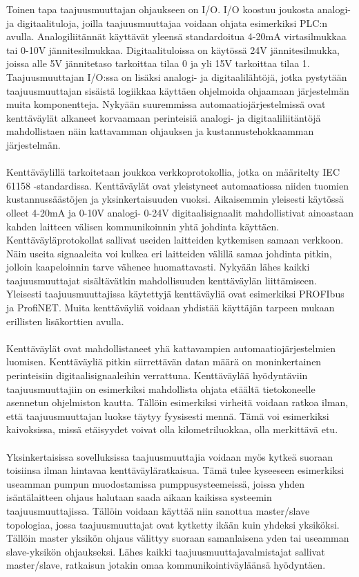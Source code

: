 \documentclass[finnish,12pt,a4paper,pdftex,elec,utf8]{aaltothesis}
\begin{document}
\noindent
Toinen tapa taajuusmuuttajan ohjaukseen on I/O. I/O koostuu joukosta analogi- ja digitaalituloja, joilla taajuusmuuttajaa voidaan ohjata esimerkiksi PLC:n avulla. Analogiliitännät käyttävät yleensä standardoitua 4-20mA virtasilmukkaa tai 0-10V jännitesilmukkaa. Digitaalituloissa on käytössä 24V jännitesilmukka, joissa alle 5V jännitetaso tarkoittaa tilaa 0 ja yli 15V tarkoittaa tilaa 1. Taajuusmuuttajan I/O:ssa on lisäksi analogi- ja digitaalilähtöjä, jotka pystytään taajuusmuuttajan sisäistä logiikkaa käyttäen ohjelmoida ohjaamaan järjestelmän muita komponentteja. Nykyään suuremmissa automaatiojärjestelmissä ovat kenttäväylät alkaneet korvaamaan perinteisiä analogi- ja digitaaliliitäntöjä mahdollistaen näin kattavamman ohjauksen ja kustannustehokkaamman järjestelmän.
\\\\
Kenttäväylillä tarkoitetaan joukkoa verkkoprotokollia, jotka on määritelty IEC 61158 -standardissa. Kenttäväylät ovat yleistyneet automaatiossa niiden tuomien kustannussäästöjen ja yksinkertaisuuden vuoksi. Aikaisemmin yleisesti käytössä olleet 4-20mA ja 0-10V analogi- 0-24V digitaalisignaalit mahdollistivat ainoastaan kahden laitteen välisen kommunikoinnin yhtä johdinta käyttäen. Kenttäväyläprotokollat sallivat useiden laitteiden kytkemisen samaan verkkoon. Näin useita signaaleita voi kulkea eri laitteiden välillä samaa johdinta pitkin, jolloin kaapeloinnin tarve vähenee huomattavasti. Nykyään lähes kaikki taajuusmuuttajat sisältävätkin mahdollisuuden kenttäväylän liittämiseen. Yleisesti taajuusmuuttajissa käytettyjä kenttäväyliä ovat esimerkiksi PROFIbus ja ProfiNET. Muita kenttäväyliä voidaan yhdistää käyttäjän tarpeen mukaan erillisten lisäkorttien avulla.
\\\\
Kenttäväylät ovat mahdollistaneet yhä kattavampien automaatiojärjestelmien luomisen. Kenttäväyliä pitkin siirrettävän datan määrä on moninkertainen perinteisiin digitaalisignaaleihin verrattuna. Kenttäväylää hyödyntäviin taajuusmuuttajiin on esimerkiksi mahdollista ohjata etäältä tietokoneelle asennetun ohjelmiston kautta. Tällöin esimerkiksi virheitä voidaan ratkoa ilman, että taajuusmuuttajan luokse täytyy fyysisesti mennä. Tämä voi esimerkiksi kaivoksissa, missä etäisyydet voivat olla kilometriluokkaa, olla merkittävä etu.
\\\\
Yksinkertaisissa sovelluksissa taajuusmuuttajia voidaan myös kytkeä suoraan toisiinsa ilman hintavaa kenttäväyläratkaisua. Tämä tulee kyseeseen esimerkiksi useamman pumpun muodostamissa pumppusysteemeissä, joissa yhden isäntälaitteen ohjaus halutaan saada aikaan kaikissa systeemin taajuusmuuttajissa. Tällöin voidaan käyttää niin sanottua master/slave topologiaa, jossa taajuusmuuttajat ovat kytketty ikään kuin yhdeksi yksiköksi. Tällöin master yksikön ohjaus välittyy suoraan samanlaisena yden tai useamman slave-yksikön ohjaukseksi. Lähes kaikki taajuusmuuttajavalmistajat sallivat master/slave, ratkaisun jotakin omaa kommunikointiväyläänsä hyödyntäen.
\end{document}
